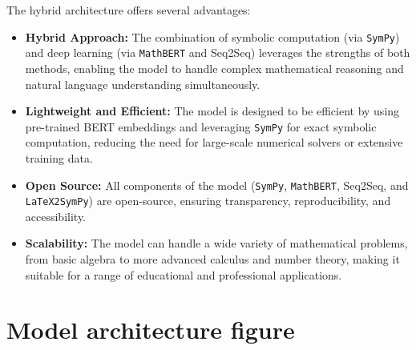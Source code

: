 \documentclass{article}
\begin{document}
The hybrid architecture offers several advantages:

\begin{itemize}
    \item \textbf{Hybrid Approach:} The combination of symbolic computation (via \texttt{SymPy}) and deep learning (via \texttt{MathBERT} and Seq2Seq) leverages the strengths of both methods, enabling the model to handle complex mathematical reasoning and natural language understanding simultaneously.
    \item \textbf{Lightweight and Efficient:} The model is designed to be efficient by using pre-trained BERT embeddings and leveraging \texttt{SymPy} for exact symbolic computation, reducing the need for large-scale numerical solvers or extensive training data.
    \item \textbf{Open Source:} All components of the model (\texttt{SymPy}, \texttt{MathBERT}, Seq2Seq, and \texttt{LaTeX2SymPy}) are open-source, ensuring transparency, reproducibility, and accessibility.
    \item \textbf{Scalability:} The model can handle a wide variety of mathematical problems, from basic algebra to more advanced calculus and number theory, making it suitable for a range of educational and professional applications.
\end{itemize}


\section{Model architecture figure}

\end{document}
